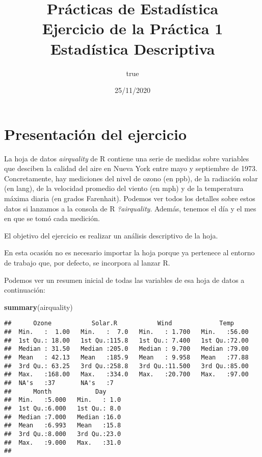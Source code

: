 \documentclass[
]{article}
\title{Prácticas de Estadística\\
Ejercicio de la Práctica 1\\
Estadística Descriptiva}
\author{true}
\date{25/11/2020}
\newenvironment{Shaded}{\begin{snugshade}}{\end{snugshade}}
\newcommand{\KeywordTok}[1]{\textcolor[rgb]{0.13,0.29,0.53}{\textbf{#1}}}
\newcommand{\NormalTok}[1]{#1}
\begin{document}
\maketitle

{
\setcounter{tocdepth}{2}
\tableofcontents
}
\hypertarget{presentaciuxf3n-del-ejercicio}{%
\section{Presentación del
ejercicio}\label{presentaciuxf3n-del-ejercicio}}

La hoja de datos \emph{airquality} de R contiene una serie de medidas
sobre variables que desciben la calidad del aire en Nueva York entre
mayo y septiembre de 1973. Concretamente, hay mediciones del nivel de
ozono (en ppb), de la radiación solar (en lang), de la velocidad
promedio del viento (en mph) y de la temperatura máxima diaria (en
grados Farenhait). Podemos ver todos los detalles sobre estos datos si
lanzamos a la consola de R \emph{?airquality}. Además, tenemos el día y
el mes en que se tomó cada medición.

El objetivo del ejercicio es realizar un análisis descriptivo de la
hoja.

En esta ocasión no es necesario importar la hoja porque ya pertenece al
entorno de trabajo que, por defecto, se incorpora al lanzar R.

Podemos ver un resumen inicial de todas las variables de esa hoja de
datos a continuación:

\begin{Shaded}
\begin{Highlighting}[]
\KeywordTok{summary}\NormalTok{(airquality)}
\end{Highlighting}
\end{Shaded}

\begin{verbatim}
##      Ozone           Solar.R           Wind             Temp      
##  Min.   :  1.00   Min.   :  7.0   Min.   : 1.700   Min.   :56.00  
##  1st Qu.: 18.00   1st Qu.:115.8   1st Qu.: 7.400   1st Qu.:72.00  
##  Median : 31.50   Median :205.0   Median : 9.700   Median :79.00  
##  Mean   : 42.13   Mean   :185.9   Mean   : 9.958   Mean   :77.88  
##  3rd Qu.: 63.25   3rd Qu.:258.8   3rd Qu.:11.500   3rd Qu.:85.00  
##  Max.   :168.00   Max.   :334.0   Max.   :20.700   Max.   :97.00  
##  NA's   :37       NA's   :7                                       
##      Month            Day      
##  Min.   :5.000   Min.   : 1.0  
##  1st Qu.:6.000   1st Qu.: 8.0  
##  Median :7.000   Median :16.0  
##  Mean   :6.993   Mean   :15.8  
##  3rd Qu.:8.000   3rd Qu.:23.0  
##  Max.   :9.000   Max.   :31.0  
## 
\end{verbatim}
\end{document}
